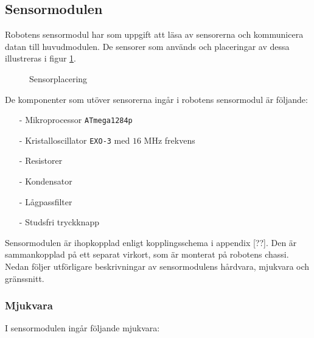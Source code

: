 \documentclass[11pt]{article}
\begin{document}
\begin{flushleft}
\subsection{Sensormodulen}
Robotens sensormodul har som uppgift att läsa av sensorerna och kommunicera datan till huvudmodulen. De sensorer som används och placeringar av dessa illustreras i figur \ref{sensors}.
\newline

\begin{figure}[htbp]
\centering
\noindent\resizebox{.8\textwidth}{!}{
		}
	\caption{Sensorplacering \label{sensors}}
\end{figure}

De komponenter som utöver sensorerna ingår i robotens sensormodul är följande:
\begin{itemize}
  \item[-] Mikroprocessor \verb+ATmega1284p+
  \item[-] Kristalloscillator \verb+EXO-3+ med $16$ MHz frekvens
  \item[-] Resistorer
  \item[-] Kondensator
  \item[-] Lågpassfilter
  \item[-] Studsfri tryckknapp
\end{itemize}

Sensormodulen är ihopkopplad enligt kopplingsschema i appendix [??]. Den är sammankopplad på ett separat virkort, som är monterat på robotens chassi. Nedan följer utförligare beskrivningar av sensormodulens hårdvara, mjukvara och gränssnitt.

\subsubsection{Mjukvara}
I sensormodulen ingår följande mjukvara: 


\end{flushleft}
\end{document}
